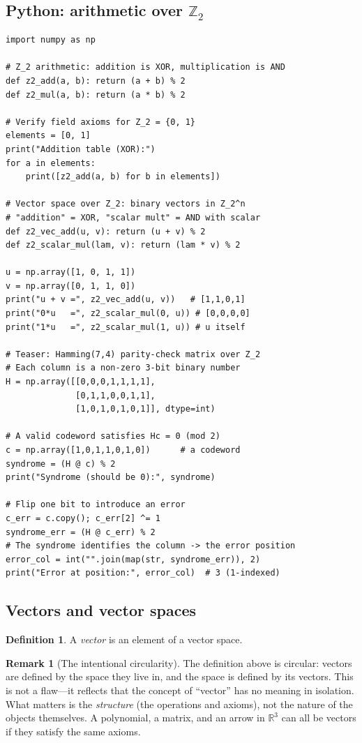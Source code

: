 \documentclass[11pt]{article}
\theoremstyle{definition}
\newtheorem{definition}{Definition}[section]
\newtheorem{remark}{Remark}[section]
\theoremstyle{plain}
\begin{document}
\subsection{Python: arithmetic over $\mathbb{Z}_2$}
\begin{lstlisting}
import numpy as np

# Z_2 arithmetic: addition is XOR, multiplication is AND
def z2_add(a, b): return (a + b) % 2
def z2_mul(a, b): return (a * b) % 2

# Verify field axioms for Z_2 = {0, 1}
elements = [0, 1]
print("Addition table (XOR):")
for a in elements:
    print([z2_add(a, b) for b in elements])

# Vector space over Z_2: binary vectors in Z_2^n
# "addition" = XOR, "scalar mult" = AND with scalar
def z2_vec_add(u, v): return (u + v) % 2
def z2_scalar_mul(lam, v): return (lam * v) % 2

u = np.array([1, 0, 1, 1])
v = np.array([0, 1, 1, 0])
print("u + v =", z2_vec_add(u, v))   # [1,1,0,1]
print("0*u   =", z2_scalar_mul(0, u)) # [0,0,0,0]
print("1*u   =", z2_scalar_mul(1, u)) # u itself

# Teaser: Hamming(7,4) parity-check matrix over Z_2
# Each column is a non-zero 3-bit binary number
H = np.array([[0,0,0,1,1,1,1],
              [0,1,1,0,0,1,1],
              [1,0,1,0,1,0,1]], dtype=int)

# A valid codeword satisfies Hc = 0 (mod 2)
c = np.array([1,0,1,1,0,1,0])      # a codeword
syndrome = (H @ c) % 2
print("Syndrome (should be 0):", syndrome)

# Flip one bit to introduce an error
c_err = c.copy(); c_err[2] ^= 1
syndrome_err = (H @ c_err) % 2
# The syndrome identifies the column -> the error position
error_col = int("".join(map(str, syndrome_err)), 2)
print("Error at position:", error_col)  # 3 (1-indexed)
\end{lstlisting}

\subsection{Vectors and vector spaces}

\begin{definition}
  A \emph{vector} is an element of a vector space.
\end{definition}

\begin{remark}[The intentional circularity]
  The definition above is circular: vectors are defined by the space they
  live in, and the space is defined by its vectors.  This is not a flaw---it
  reflects that the concept of ``vector'' has no meaning in isolation.
  What matters is the \emph{structure} (the operations and axioms), not the
  nature of the objects themselves.  A polynomial, a matrix, and an arrow in
  $\mathbb{R}^3$ can all be vectors if they satisfy the same axioms.
\end{remark}
\end{document}
